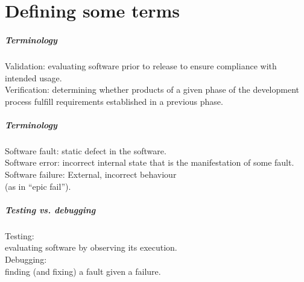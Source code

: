 \documentclass{beamer}
\newenvironment{changemargin}[1]{%
  \begin{list}{}{%
    \setlength{\topsep}{0pt}%
    \setlength{\leftmargin}{#1}%
    \setlength{\rightmargin}{1em}
    \setlength{\listparindent}{\parindent}%
    \setlength{\itemindent}{\parindent}%
    \setlength{\parsep}{\parskip}%
  }%
  \item[]}{\end{list}}
\begin{document}
\part{Defining some terms}
\begin{frame}
 
  \partpage
\end{frame}


\begin{frame}

  \frametitle{Terminology}
  
  \begin{changemargin}{2em}
\Large
\alert{Validation}: evaluating software prior to release to 
ensure compliance with intended usage.\\[1em]

\alert{Verification}: determining whether products of a given phase
of the development process fulfill requirements established in a 
previous phase.
  \end{changemargin}

\end{frame}

\begin{frame}

\frametitle{Terminology}
\Large

  \begin{changemargin}{2em}
\alert{Software fault}: static defect in the software.\\[1em]

\alert{Software error}: incorrect internal state that is the manifestation
of some fault.\\[1em]

\alert{Software failure}: External, incorrect behaviour \\ 
\hspace*{2em} (as in ``epic fail'').
  \end{changemargin}

\end{frame}

\begin{frame}

\frametitle{Testing vs. debugging}
\Large
  \begin{changemargin}{1em}

\alert{Testing}: \\
\hspace*{1em} evaluating software by observing its execution.\\[1em]

\alert{Debugging}: \\
\hspace*{1em} finding (and fixing) a fault given a failure.
  \end{changemargin}

\end{frame}
\end{document}
